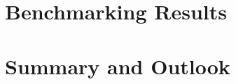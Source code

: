 \documentclass[a4paper, 12pt]{article}
\begin{document}
\section{Benchmarking Results}






\section{Summary and Outlook}

\sloppy
\printbibliography
\end{document}
